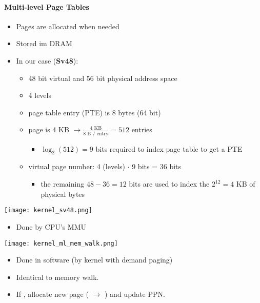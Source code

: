 \paragraph{Multi-level Page Tables}
\begin{itemize}
    \item Pages are allocated when needed
    \item Stored im DRAM
    \item In our case (\textbf{Sv48}):
          \begin{itemize}
              \item 48 bit virtual and 56 bit physical address space
              \item 4 levels
              \item page table entry (PTE) is 8 bytes (64 bit)
              \item page is 4 KB $\to \frac{\text{4 KB}}{\text{8 B / entry}} = 512$ entries
                    \begin{itemize}
                        \item $\log_{2}(512) = 9$ bits required to index page table to get a PTE
                    \end{itemize}
              \item virtual page number: 4 (levels) $\cdot$ 9 bits = 36 bits
                    \begin{itemize}
                        \item the remaining $48-36=12$ bits are used to index the ${2}^{12} = 4$ KB of physical bytes
                    \end{itemize}
          \end{itemize}
\end{itemize}

\begin{center}
    \texttt{[image: kernel\_sv48.png]}
\end{center}

\begin{itemize}
    \item Done by CPU's MMU
\end{itemize}
\begin{center}
    \texttt{[image: kernel\_ml\_mem\_walk.png]}
\end{center}

\newpar{}
\begin{itemize}
    \item Done in software (by kernel with demand paging)
    \item Identical to memory walk.
    \item If , allocate new page ( $\to$ ) and update PPN.\ %
\end{itemize}

